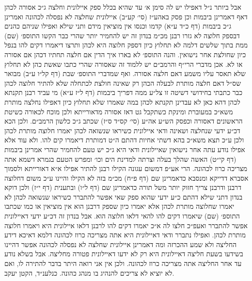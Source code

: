 \documentclass[12pt, openany]{book}
\begin{document}
\begin{multicols}{2}
אבל ביותר נ״ל דאפילו יש לה סימן א׳ עד שהיא בכלל ספק איילונית וחלצה ג״כ אסורה לכהן דאף דאמרינן ביבמות וכן פסק באהע״ז (סי׳ קע״ב) איילונית שחלצה לא נפסלה לכהונה ואמרינן ג״כ ביבמות (דף כ״ד ע״א) קדמו וכנסו אין מוציאין מידם ותני שילא ואפילו שניהם כהנים דבספק חלוצה לא גזרו רבנן מכ״מ בנדון זה יש להחמיר יותר שהרי כבר הקשו התוספ׳ (שם) ממת בתוך שלשים דלמה לא תחלוץ כיון דספק חלוצה היא לכהן ותרצו דיאמרו דקים להו בנפל כיון שחולצת אחר נישואין. והנה התוספ׳ לא בארו איך הדין אם חלצה תחתיו דכהן אם אסורה או לא. אכן מדברי הרי״ף והרמב״ם יש ללמוד זה שאסורה שהרי כתבו שאשת כהן לא תחלוץ שלא תאסר עליו משמע דאם חלצה אסורה. ואף שמדברי התוספ׳ שבת (דף קל״ו ע״ב) מבואר שס״ל דאם חלצה מותרת לבעלה הכהן רק שאינה חולצת לכתחלה שלא להתיר חלוצה לכהן כבר כתבתי בחידושי דשיטה זו צל״ע ממה דפריך ביבמות (דף ל״ז ע״א) מי עביד רבנן תקנתא לכהן דהא כאן לא עבדינן תקנתא לכהן במה שאמרו שלא תחלוץ כיון דאפילו נחלצה מותרת משא״כ במעוברת ומינקת כשתקבל גט דאז אסורה מדאורייתא ולכן מוכח לכאורה כשיטת הראשונים דאסורה וכפסק הש״ע אה״ע (סי׳ קס״ד ס״ז) שכתב ג״כ כלשון הרמב״ם. ולכן הכא דכ״ע ידעי שנחלצה ושאינה ודאי איילונית כשיראו שנשואה לכהן יאמרו חלוצה מותרת לכהן ולכן ע״כ תצא משא״כ בהא דשתי אחיות דהתם ה״ט דמותרת דיאמרו קים להו. ולא עוד אלא אפילו נודע עתה אחר נישואין שאיילונית ודאי היא ג״כ יש טעם להחמיר שהרי אמרינן ביבמות (דף קי״ט) האשה שהלך בעלה וצרתה למדינת הים וכו׳ ומפרש הטעם בגמרא דשמא אתה מצריכה כרוז לכהונה. הרי אע״פ דמשום עגונה הקילו רבנן להתיר אפילו א״א דאורייתא ולסמוך אסברא דדייקא ומנסבא כדאמרינן שם (דף פ״ח) מכ״מ בזה לא הקילו והיינו ע״כ משום דחלוצה דרבנן ודרבנן צריך חזוק יותר משל תורה כדאמרינן שם (דף ל״ו) ובתענית (דף י״ז) ולכן דוקא בנדון דתני שילא דהתם כ״ע ידעי שהוא ספק שאי אפשר להתברר כשיראו שנשואה לכהן לא יאמרו שחלוצה מותרת לכהן אלא יאמרו כיון שספק דרבנן הוא אין מוציאין או כמו שכתבו התוספ׳ (שם) שיאמרו דקים להו להאי דלאו חלוצה הוא. אבל בנדון זה דכ״ע ידעי דאיילונית אפשר להתברר ואעפ״כ חלצו לה א״כ יאמרו דקים להו לרבנן דלאו איילונית היא ויאמרו חלוצה מותרת לכהן. ואפילו נתברר ודאי דאיילונית היא אתה מצריכה כרוז לכהונה דלמא דאיכא דידע החליצה ולא שמע ההכרזה ומה דאמרינן איילונית שחלצה לא נפסלה לכהונה אפשר דהיינו בשידעו בשעת חליצה דאיילונית היא רק לא ידעו דאיילונית פטורה מחליצה. אבל בשלא נודע עד אחר החליצה אתה מצריכה כרוז לכהונה. ולכן אין אני רואה היתר בדבר להתירה לו, ואם לא יוציא לא צריכים להנהיג בו מנהג כהונה. כנלענ״ד, הקטן יעקב.\\\vspace{0pt}

\end{multicols}\newpage
\end{document}
